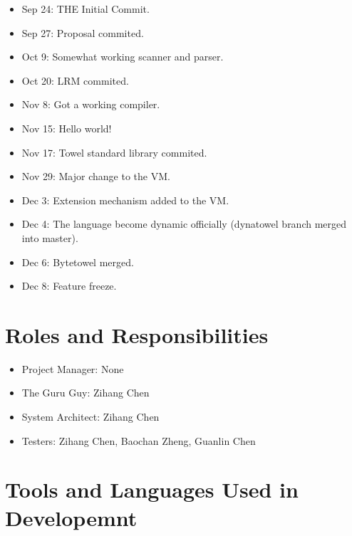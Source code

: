 \documentclass{report}
\begin{document}
\begin{itemize}
\item Sep 24: THE Initial Commit.
\item Sep 27: Proposal commited.
\item Oct 9: Somewhat working scanner and parser.
\item Oct 20: LRM commited.
\item Nov 8: Got a working compiler.
\item Nov 15: Hello world!
\item Nov 17: Towel standard library commited.
\item Nov 29: Major change to the VM.
\item Dec 3: Extension mechanism added to the VM.
\item Dec 4: The language become dynamic officially (dynatowel branch merged into master).
\item Dec 6: Bytetowel merged.
\item Dec 8: Feature freeze.
\end{itemize}

\section{Roles and Responsibilities}

\begin{itemize}
\item Project Manager: None
\item The Guru Guy: Zihang Chen
\item System Architect: Zihang Chen
\item Testers: Zihang Chen, Baochan Zheng, Guanlin Chen
\end{itemize}
\section{Tools and Languages Used in Developemnt}
\end{document}
